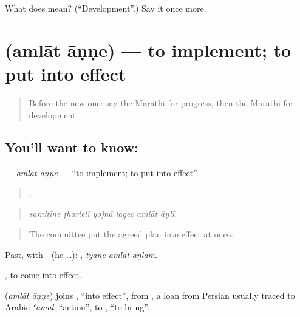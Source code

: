 \begin{tcolorbox}[breakable,colback=teal!4,colframe=teal!35!black,title={Before you move on}]
What does  mean? (\textquotedblleft{}Development\textquotedblright{}.) Say it once more.
\end{tcolorbox}
\section[\texorpdfstring{\mr{अमलात} \mr{आणणे} (amlāt āṇṇe)}{अमलात आणणे (amlāt āṇṇe)}]{  (amlāt āṇṇe) — to implement; to put into effect}

\label{lesson:MR-C388-amlat-anne}



\begin{quote}
Before the new one: say the Marathi for progress, then the Marathi for development.
\end{quote}

\subsection*{You'll want to know:  }
\textbf{ } — \emph{amlāt āṇṇe} — \textquotedblleft{}to implement; to put into effect\textquotedblright{}.

\begin{quote}
     .
\end{quote}

\begin{quote}
\emph{samitīne ṭharlelī yojnā lagec amlāt āṇlī.}
\end{quote}

\begin{quote}
The committee put the agreed plan into effect at once.
\end{quote}

Past, with - (he …):   , \emph{tyāne amlāt āṇlaṁ}.

 , to come into effect.

\begin{cousinweb}
\textbf{ } (\emph{amlāt āṇṇe}) joins , \textquotedblleft{}into effect\textquotedblright{}, from , a loan from Persian usually traced to Arabic \emph{ʿamal}, \textquotedblleft{}action\textquotedblright{}, to , \textquotedblleft{}to bring\textquotedblright{}.
\end{cousinweb}

